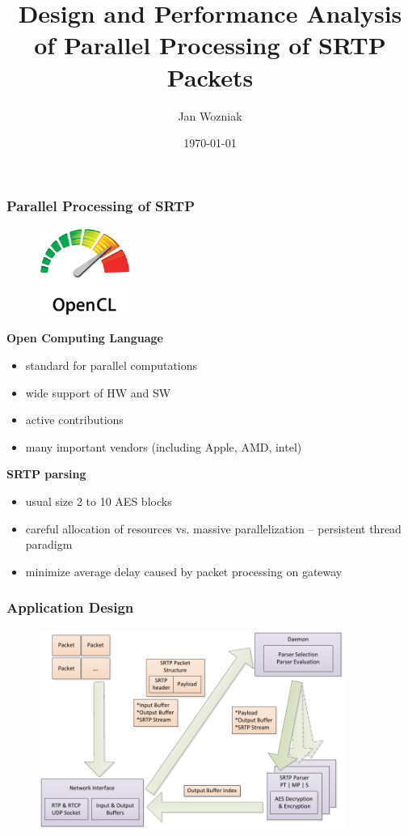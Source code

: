 \documentclass[10pt, xcolor=pdflatex, dvipsnames, table]{beamer}
\title{Design and Performance Analysis of Parallel
Processing of SRTP Packets}
\author{Jan Wozniak}
\institute[FIT VUT]{Vysoké učení technické v~Brně\\
Fakulta informační technologií}
\date{\today}
\begin{document}
\begin{frame}[plain]
\titlepage
\end{frame}


\begin{frame}
\frametitle{Parallel Processing of SRTP}

\begin{figure}
\includegraphics[width=3cm]{img/OpenCL_Logo.png}
\end{figure}

\textbf{Open Computing Language} 
\begin{itemize}
  \item standard for parallel computations
  \item wide support of HW and SW
  \item active contributions 
  \item many important vendors (including Apple, AMD, intel)
\end{itemize} 

\vspace{1.5em}

\textbf{SRTP parsing}
\begin{itemize}
\item usual size 2 to 10 AES blocks
\item careful allocation of resources vs. massive parallelization -- 
persistent thread paradigm
\item minimize average delay caused by packet processing on gateway
\end{itemize}
\end{frame}






\begin{frame}
\frametitle{Application Design}
\begin{figure}[H]
\centering
\includegraphics[width=10cm,keepaspectratio]{img/eeit.pdf}
\end{figure}
\end{frame}
\end{document}

